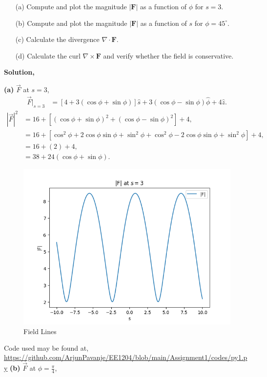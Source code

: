 \documentclass{article}
\begin{document}
\begin{itemize}
    \item[(a)] Compute and plot the magnitude $\lvert \mathbf{F} \rvert$ as a function of $\phi$ for $s = 3$.
    \item[(b)] Compute and plot the magnitude $\lvert \mathbf{F} \rvert$ as a function of $s$ for $\phi = 45^\circ$.
    \item[(c)] Calculate the divergence $\nabla \cdot \mathbf{F}$.
    \item[(d)] Calculate the curl $\nabla \times \mathbf{F}$ and verify whether the field is conservative.
\end{itemize}
\textbf{Solution,}\newline

\textbf{(a)} $\vec{F}$ at $s=3$,
\begin{align*}
\vec{F}\big|_{s=3} &= \left[ 4 + 3(\cos\phi + \sin\phi) \right] \hat{s} 
+ 3 (\cos\phi - \sin\phi) \hat{\phi} 
+ 4 \hat{z}.
\end{align*}
\begin{align*}
|\vec{F}|^2 &= 16 + \left[ (\cos\phi + \sin\phi)^2 + (\cos\phi - \sin\phi)^2 \right] + 4, \\
&= 16 + \left[ \cos^2\phi + 2\cos\phi\sin\phi + \sin^2\phi 
+ \cos^2\phi - 2\cos\phi\sin\phi + \sin^2\phi \right] + 4, \\
&= 16 + (2) + 4, \\
 &= 38 + 24 (\cos\phi + \sin\phi).
\end{align*}
\pagebreak
\begin{figure}[h!]
   \centering
   \includegraphics[width=0.6\columnwidth]{figs/fig1.png}
    \caption{Field Lines}
   \label{label}
\end{figure}
Code used may be found at, \newline \url{https://github.com/ArjunPavanje/EE1204/blob/main/Assignment1/codes/py1.py} \newline
\textbf{(b)} $\vec{F}$ at $\phi = \frac{\pi}{4}$,
\end{document}
